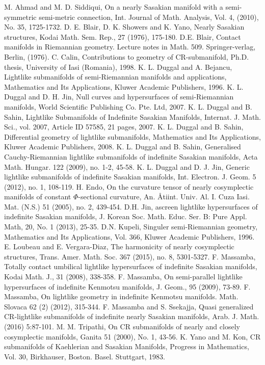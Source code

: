 \documentclass[reqno, 12pt]{amsart}
\numberwithin{equation}{section}
\begin{document}
\begin{thebibliography}{xxx} 
 M. Ahmad and M. D. Siddiqui, On a nearly Sasakian manifold with a semi-symmetric semi-metric connection, Int. Journal of Math. Analysis, Vol. 4, (2010), No. 35, 1725-1732.
 D. E. Blair, D. K. Showers and K. Yano, Nearly Sasakian structures, Kodai Math. Sem. Rep., 27 (1976), 175-180.
  D.E. Blair, Contact manifolds in Riemannian geometry. Lecture notes in Math. 509. Springer-verlag, Berlin, (1976).
 C. Calin, Contributions to geometry of CR-submanifold, Ph.D. thesis, University
of Iasi (Romania), 1998.
 K. L. Duggal and A. Bejancu, Lightlike submanifolds of semi-Riemannian  manifolds and applications, Mathematics and Its Applications, Kluwer Academic Publishers, 1996.   
  K. L. Duggal and  D. H. Jin, Null curves and hypersurfaces of semi-Riemannian manifolds, World Scientific Publishing Co. Pte. Ltd, 2007.
 K. L. Duggal and B. Sahin, Lightlike Submanifolds of Indefinite Sasakian Manifolds, Internat. J.  Math. Sci., vol. 2007, Article ID 57585, 21 pages, 2007.
 K. L. Duggal and B. Sahin, Differential geometry of lightlike submanifolds, Mathematics and Its Applications, Kluwer Academic Publishers, 2008. 
 K. L. Duggal and B. Sahin, Generalised Cauchy-Riemannian lightlike submanifolds of indefinite Sasakian manifolds,  Acta Math. Hungar. 122 (2009), no. 1-2, 45-58. 
 K. L. Duggal and D. J. Jin, Generic lightlike submanifolds of indefinite Sasakian manifolds,  Int. Electron. J. Geom. 5 (2012), no. 1, 108-119.  
 H. Endo, On the curvature tensor of nearly cosymplectic manifolds of constant $\Phi$-sectional curvature,  An. Åtiint. Univ. Al. I. Cuza Iasi. Mat. (N.S.) 51 (2005), no. 2, 439-454.
 D.H. Jin, ascreen lightlike hypersurfaces of indefinite Sasakian manifolds, J. Korean Soc. Math. Educ. Ser. B: Pure Appl. Math, 20, No. 1 (2013), 25-35.
 D.N. Kupeli, Singuler semi-Riemannian geometry, Mathematics and Its Applications, Vol. 366, Kluwer Academic Publishers, 1996.
 E. Loubeau and  E. Vergara-Diaz, The harmonicity of nearly cosymplectic structures,  Trans. Amer. Math. Soc. 367 (2015), no. 8, 5301-5327.
 F. Massamba, Totally contact umbilical lightlike hypersurfaces of indefinite Sasakian manifolds, Kodai Math. J., 31 (2008), 338-358.
 F. Massamba, On semi-parallel lightlike hypersurfaces of indefinite Kenmotsu manifolds, J. Geom., 95 (2009), 73-89.
 F. Massamba, On lightlike geometry in indefinite Kenmotsu manifolds. Math. Slovaca 62 (2) (2012), 315-344.
 F. Massamba and S. Ssekajja, Quasi generalized CR-lightlike submanifolds of indefinite nearly Sasakian manifolds, Arab. J. Math. (2016) 5:87-101.
 M. M. Tripathi, On CR submanifolds of nearly and closely cosymplectic manifolds, Ganita 51 (2000), No. 1, 43-56.
  K. Yano and M. Kon, CR submanifolds of Kaehlerian and Sasakian Manifolds, Progress in Mathematics, Vol. 30, Birkhauser, Boston. Basel. Stuttgart, 1983.
\end{thebibliography}
\end{document}
